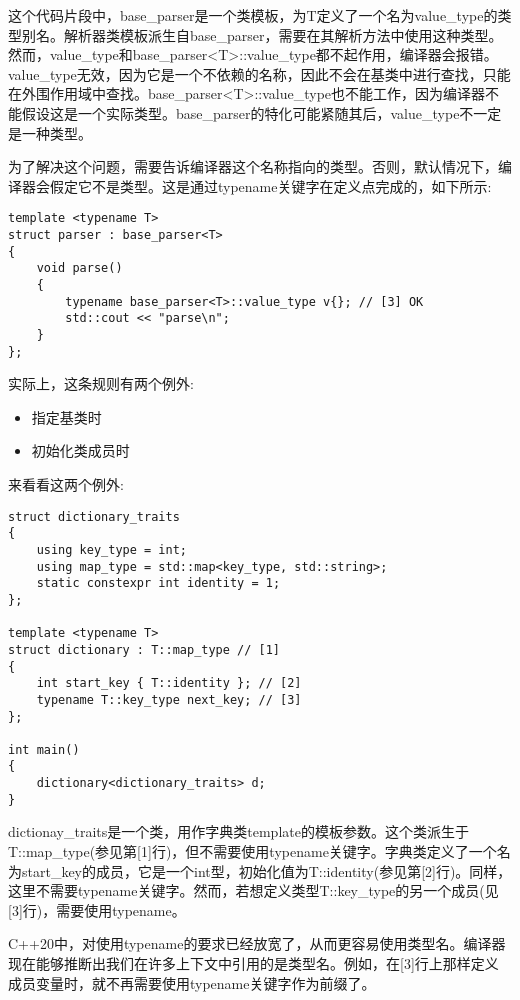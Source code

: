 这个代码片段中，base\_parser是一个类模板，为T定义了一个名为value\_type的类型别名。解析器类模板派生自base\_parser，需要在其解析方法中使用这种类型。然而，value\_type和base\_parser<T>::value\_type都不起作用，编译器会报错。value\_type无效，因为它是一个不依赖的名称，因此不会在基类中进行查找，只能在外围作用域中查找。base\_parser<T>::value\_type也不能工作，因为编译器不能假设这是一个实际类型。base\_parser的特化可能紧随其后，value\_type不一定是一种类型。

为了解决这个问题，需要告诉编译器这个名称指向的类型。否则，默认情况下，编译器会假定它不是类型。这是通过typename关键字在定义点完成的，如下所示:

\begin{lstlisting}[style=styleCXX]
template <typename T>
struct parser : base_parser<T>
{
	void parse()
	{
		typename base_parser<T>::value_type v{}; // [3] OK
		std::cout << "parse\n";
	}
};
\end{lstlisting}

实际上，这条规则有两个例外:

\begin{itemize}
\item
指定基类时

\item
初始化类成员时
\end{itemize}

来看看这两个例外:

\begin{lstlisting}[style=styleCXX]
struct dictionary_traits
{
	using key_type = int;
	using map_type = std::map<key_type, std::string>;
	static constexpr int identity = 1;
};

template <typename T>
struct dictionary : T::map_type // [1]
{
	int start_key { T::identity }; // [2]
	typename T::key_type next_key; // [3]
};

int main()
{
	dictionary<dictionary_traits> d;
}
\end{lstlisting}

dictionay\_traits是一个类，用作字典类template的模板参数。这个类派生于T::map\_type(参见第[1]行)，但不需要使用typename关键字。字典类定义了一个名为start\_key的成员，它是一个int型，初始化值为T::identity(参见第[2]行)。同样，这里不需要typename关键字。然而，若想定义类型T::key\_type的另一个成员(见[3]行)，需要使用typename。

C++20中，对使用typename的要求已经放宽了，从而更容易使用类型名。编译器现在能够推断出我们在许多上下文中引用的是类型名。例如，在[3]行上那样定义成员变量时，就不再需要使用typename关键字作为前缀了。

